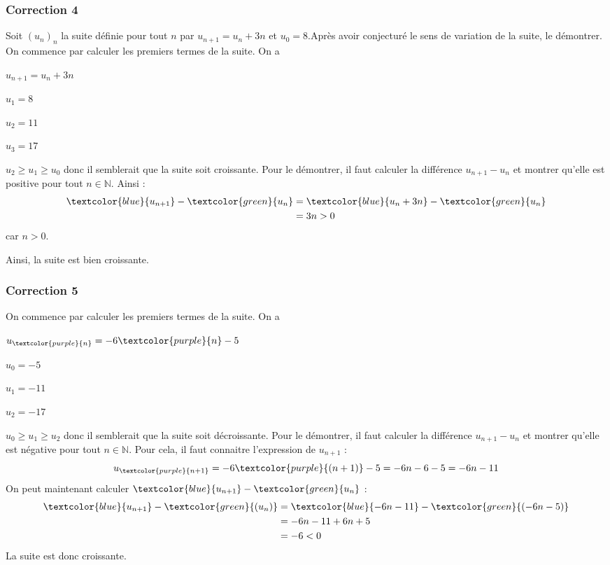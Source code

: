 \documentclass[15pt, mathserif]{beamer}
\newcommand{\N}{\mathbb{N}}			%
\begin{document}
\begin{frame}
\vspace{-10mm}
	\frametitle{Correction 4}
\bigskip 
 Soit $(u_n)_n$ la suite définie pour tout $n$ par $u_{n+1}=u_n+3n$ et $u_0=8$.Après avoir conjecturé le sens de variation de la suite, le démontrer. On commence par calculer les premiers termes de la suite. On a 
 \begin{multicols}{4} 
 $u_{n+1}=u_n+3n$ 
 
  \columnbreak 
 
 $u_1=8$ 
 
 \columnbreak 
 
 $u_2=11$ 
 
 \columnbreak 
 
 $u_3=17$ 
  \end{multicols} $u_2 \geqslant u_1 \geqslant u_0$ donc il semblerait que la suite soit croissante. Pour le démontrer, il faut calculer la différence $u_{n+1} -u_n$ et montrer qu'elle est positive pour tout $n \in \N$. Ainsi : \begin{align*} \textcolor{blue}{u_{n+1}}-\textcolor{green}{u_n} &=\textcolor{blue}{  u_n+3n}-\textcolor{green}{u_n} \\ 
 &=3n >0 
 \end{align*} car $n>0$. 
 
 Ainsi, la suite est bien croissante. \end{frame}


\begin{frame}
\vspace{-10mm}
	\frametitle{Correction 5}
 \vspace*{1cm} 
 On commence par calculer les premiers termes de la suite. On a 
 \begin{multicols}{4} 
 $u_{\textcolor{purple}{n}}=-6\textcolor{purple}{n}-5$ 
 
  \columnbreak 
 
  $u_0=-5$ 
 
  \columnbreak 
 
 $u_1=-11$ 
 
 \columnbreak 
 
 $u_2=-17$ 
  \end{multicols} $u_0 \geqslant u_1 \geqslant u_2$ donc il semblerait que la suite soit décroissante. Pour le démontrer, il faut calculer la différence $u_{n+1} -u_n$ et montrer qu'elle est négative pour tout $n \in \N$. Pour cela, il faut connaitre l'expression de $u_{n+1}$ : $$u_{\textcolor{purple}{n+1}} = -6\textcolor{purple}{(n+1)}-5=-6n-6-5=-6n-11$$ On peut maintenant calculer $\textcolor{blue}{u_{n+1}}-\textcolor{green}{u_n} $ : \begin{align*} \textcolor{blue}{u_{n+1}}-\textcolor{green}{(u_n)} &=\textcolor{blue}{-6n-11}-\textcolor{green}{(-6n-5)} \\ 
 &= -6n-11+6n+5\\ 
 &= -6 <0 
 \end{align*} 
 La suite est donc croissante.\end{frame}
\end{document}

